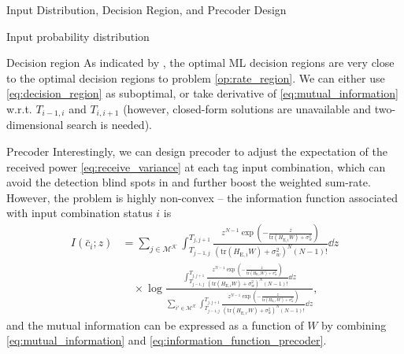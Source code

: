 \documentclass[journal]{IEEEtran}
\begin{document}
\begin{section}{Input Distribution, Decision Region, and Precoder Design}
\begin{subsection}{Input probability distribution}


		\end{subsection}

		\begin{subsection}{Decision region}
			As indicated by \cite{Qian2019b}, the optimal ML decision regions are very close to the optimal decision regions to problem \eqref{op:rate_region}. We can either use \eqref{eq:decision_region} as suboptimal, or take derivative of \eqref{eq:mutual_information} w.r.t. $T_{i-1,i}$ and $T_{i,i+1}$ (however, closed-form solutions are unavailable and two-dimensional search is needed).
		\end{subsection}

		\begin{subsection}{Precoder}
			Interestingly, we can design precoder to adjust the expectation of the received power \eqref{eq:receive_variance} at each tag input combination, which can avoid the detection blind spots in \cite{Qian2019} and further boost the weighted sum-rate. However, the problem is highly non-convex -- the information function associated with input combination status $i$ is
			\begin{align}
				I(\bar{c}_i ; z)
				& = \sum_{j \in \mathcal{M^K}} \int_{T_{j-1,j}}^{T_{j,j+1}} \frac{z^{N-1} \exp \left(-\frac{z}{\mathrm{tr}(H_{\mathrm{E},i} W) + \sigma_w^2}\right)}{\left(\mathrm{tr}(H_{\mathrm{E},i} W) + \sigma_w^2\right)^N (N-1)!} \dd z\nonumber\\
				& \quad \times \log \frac{\int_{T_{j-1,j}}^{T_{j,j+1}} \frac{z^{N-1} \exp \left(-\frac{z}{\mathrm{tr}(H_{\mathrm{E},i} W) + \sigma_w^2}\right)}{\left(\mathrm{tr}(H_{\mathrm{E},i} W) + \sigma_w^2\right)^N (N-1)!} \dd z}{\sum_{i' \in \mathcal{M^K}} \int_{T_{j-1,j}}^{T_{j,j+1}} \frac{z^{N-1} \exp \left(-\frac{z}{\mathrm{tr}(H_{\mathrm{E},i'} W) + \sigma_w^2}\right)}{\left(\mathrm{tr}(H_{\mathrm{E},i'} W) + \sigma_w^2\right)^N (N-1)!} \dd z},
				\label{eq:information_function_precoder}
			\end{align}
			and the mutual information can be expressed as a function of $W$ by combining \eqref{eq:mutual_information} and \eqref{eq:information_function_precoder}.


\end{subsection}
\end{section}
\end{document}
